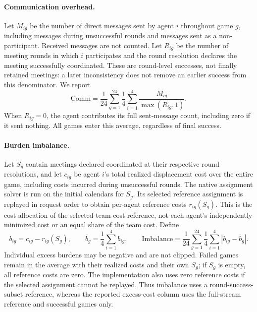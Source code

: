\paragraph{Communication overhead.}
Let $M_{ig}$ be the number of direct messages sent by agent $i$ throughout
game $g$, including messages during unsuccessful rounds and messages sent
as a non-participant. Received messages are not counted. Let $R_{ig}$ be
the number of meeting rounds in which $i$ participates and the round
resolution declares the meeting successfully coordinated. These are
round-level successes, not finally retained meetings: a later inconsistency
does not remove an earlier success from this denominator. We report
\begin{equation}
 \mathrm{Comm}=\frac{1}{24}\sum_{g=1}^{24}\frac{1}{4}
 \sum_{i=1}^{4}\frac{M_{ig}}{\max(R_{ig},1)}.
\end{equation}
When $R_{ig}=0$, the agent contributes its full sent-message count, including
zero if it sent nothing. All games enter this average, regardless of final
success.

\paragraph{Burden imbalance.}
Let $S_g$ contain meetings declared coordinated at their respective round
resolutions, and let $c_{ig}$ be agent $i$'s total realized displacement cost
over the entire game, including costs incurred during unsuccessful rounds.
The native assignment solver is run on the initial calendars for $S_g$.
Its selected reference assignment is replayed in request order to obtain
per-agent reference costs $r_{ig}(S_g)$. This is the cost allocation of the
selected team-cost reference, not each agent's independently minimized cost
or an equal share of the team cost. Define
\begin{equation}
 b_{ig}=c_{ig}-r_{ig}(S_g),\qquad
 \bar b_g=\frac14\sum_{i=1}^{4}b_{ig},\qquad
 \mathrm{Imbalance}=\frac1{24}\sum_{g=1}^{24}\frac14
 \sum_{i=1}^{4}|b_{ig}-\bar b_g|.
\end{equation}
Individual excess burdens may be negative and are not clipped. Failed games
remain in the average with their realized costs and their own $S_g$;
if $S_g$ is empty, all reference costs are zero. The implementation also
uses zero reference costs if the selected assignment cannot be replayed.
Thus imbalance uses a round-success-subset reference, whereas the reported
excess-cost column uses the full-stream reference and successful games only.

